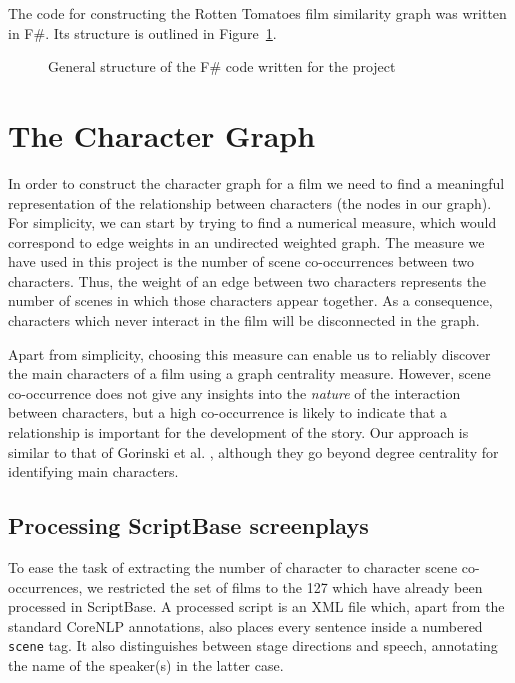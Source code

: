 \documentclass[bsc,frontabs,singlespacing,parskip, twoside]{infthesis}
\begin{document}
The code for constructing the Rotten Tomatoes film similarity graph was written in F\#. Its structure is outlined in Figure~\ref{fig:fsharpdirtree}.

\begin{figure}[th!]
\caption{General structure of the F\# code written for the project}
\label{fig:fsharpdirtree}
\end{figure}

\section{The Character Graph}
In order to construct the character graph for a film we need to find a meaningful representation of the relationship between characters (the nodes in our graph). For simplicity, we can start by trying to find a numerical measure, which would correspond to edge weights in an undirected weighted graph. The measure we have used in this project is the number of scene co-occurrences between two characters. Thus, the weight of an edge between two characters represents the number of scenes in which those characters appear together. As a consequence, characters which never interact in the film will be disconnected in the graph. 

Apart from simplicity, choosing this measure can enable us to reliably discover the main characters of a film using a graph centrality measure. However, scene co-occurrence does not give any insights into the \textit{nature} of the interaction between characters, but a high co-occurrence is likely to indicate that a relationship is important for the development of the story. Our approach is similar to that of Gorinski et al. \cite{Gorinski2015}, although they go beyond degree centrality for identifying main characters.

\subsection{Processing ScriptBase screenplays}
\label{sec:processing_scriptbase}
To ease the task of extracting the number of character to character scene co-occurrences, we restricted the set of films to the 127 which have already been processed in ScriptBase. A processed script is an XML file which, apart from the standard CoreNLP annotations, also places every sentence inside a numbered \texttt{scene} tag. It also distinguishes between stage directions and speech, annotating the name of the speaker(s) in the latter case.
\end{document}

